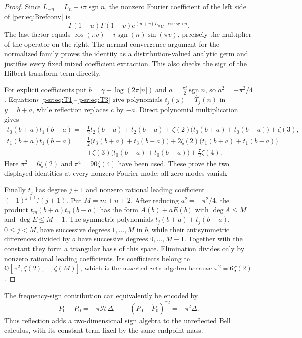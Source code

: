\documentclass[11pt,letterpaper]{article}
\numberwithin{equation}{section}
\theoremstyle{plain}
\theoremstyle{definition}
\theoremstyle{remark}
\begin{document}
\begin{proof}
Since $L_{-n}=L_n-i\pi\operatorname{sgn}n$, the nonzero Fourier
coefficient of the left side of \eqref{per:eq:Brefconv} is
\[
 \Gamma(1-u)\Gamma(1-v)
       e^{(u+v)L_n}e^{-i\pi v\operatorname{sgn}n}.
\]
The last factor equals
$\cos(\pi v)-i\operatorname{sgn}(n)\sin(\pi v)$, precisely the
multiplier of the operator on the right. The normal-convergence argument
for the normalized family proves the identity as a distribution-valued
analytic germ and justifies every fixed mixed coefficient extraction.
This also checks the sign of the Hilbert-transform term directly.

For explicit coefficients put $b=\gamma+\log(2\pi|n|)$ and
$a=\tfrac{\pi i}{2}\operatorname{sgn}n$, so $a^2=-\pi^2/4$.
Equations \eqref{per:eq:T1}--\eqref{per:eq:T3} give polynomials
$t_j(y)=\widehat T_j(n)$ in $y=b+a$, while reflection replaces $a$
by $-a$. Direct polynomial multiplication gives
\begin{align*}
 t_0(b+a)t_1(b-a)
 ={}&\tfrac12t_2(b+a)+t_2(b-a)
    +\zeta(2)\bigl(t_0(b+a)+t_0(b-a)\bigr)+\zeta(3),\\
 t_1(b+a)t_1(b-a)
 ={}&\tfrac12\bigl(t_3(b+a)+t_3(b-a)\bigr)
    +2\zeta(2)\bigl(t_1(b+a)+t_1(b-a)\bigr)\\
 &+\zeta(3)\bigl(t_0(b+a)+t_0(b-a)\bigr)+\tfrac72\zeta(4).
\end{align*}
Here $\pi^2=6\zeta(2)$ and $\pi^4=90\zeta(4)$ have been used.
These prove the two displayed identities at every nonzero Fourier mode;
all zero modes vanish.

Finally $t_j$ has degree $j+1$ and nonzero rational leading coefficient
$(-1)^{j+1}/(j+1)$. Put $M=m+n+2$. After reducing $a^2=-\pi^2/4$,
the product $t_m(b+a)t_n(b-a)$ has the form
$A(b)+aE(b)$ with $\deg A\le M$ and $\deg E\le M-1$.
The symmetric polynomials $t_j(b+a)+t_j(b-a)$, $0\le j<M$,
have successive degrees $1,\ldots,M$ in $b$, while their antisymmetric
differences divided by $a$ have successive degrees $0,\ldots,M-1$.
Together with the constant they form a triangular basis of this space.
Elimination divides only by nonzero rational leading coefficients.
Its coefficients belong to
$\mathbb Q[\pi^2,\zeta(2),\ldots,\zeta(M)]$, which is the asserted
zeta algebra because $\pi^2=6\zeta(2)$.
\end{proof}

The frequency-sign contribution can equivalently be encoded by
\[
 P_0-\check P_0=-\pi\mathcal H\Delta,\qquad
 (P_0-\check P_0)^{*2}=-\pi^2\Delta.
\]
Thus reflection adds a two-dimensional sign algebra to the unreflected
Bell calculus, with its constant term fixed by the same endpoint mass.
\end{document}
